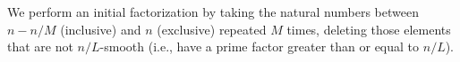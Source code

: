 \begin{definition}
\label{initial-factorization-def}
\leanok
We perform an initial factorization by taking the natural numbers between
  $n-n/M$ (inclusive) and $n$ (exclusive) repeated $M$ times, deleting those elements that are
  not $n/L$-smooth (i.e., have a prime factor greater than or equal to $n/L$).
\end{definition}
